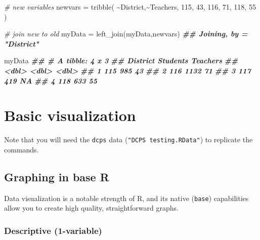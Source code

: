 \documentclass[
  12pt,
]{krantz}
\newenvironment{Shaded}{\begin{snugshade}}{\end{snugshade}}
\newcommand{\CommentTok}[1]{\textcolor[rgb]{0.56,0.35,0.01}{\textit{#1}}}
\newcommand{\DecValTok}[1]{\textcolor[rgb]{0.00,0.00,0.81}{#1}}
\newcommand{\DocumentationTok}[1]{\textcolor[rgb]{0.56,0.35,0.01}{\textbf{\textit{#1}}}}
\newcommand{\FunctionTok}[1]{\textcolor[rgb]{0.00,0.00,0.00}{#1}}
\newcommand{\NormalTok}[1]{#1}
\newcommand{\OtherTok}[1]{\textcolor[rgb]{0.56,0.35,0.01}{#1}}
\newcommand{\SpecialCharTok}[1]{\textcolor[rgb]{0.00,0.00,0.00}{#1}}
\begin{document}
\begin{Shaded}
\begin{Highlighting}[]
  \CommentTok{\# new variables}
\NormalTok{    newvars }\OtherTok{=} \FunctionTok{tribble}\NormalTok{(}
      \SpecialCharTok{\textasciitilde{}}\NormalTok{District,}\SpecialCharTok{\textasciitilde{}}\NormalTok{Teachers,}
      \DecValTok{115}\NormalTok{, }\DecValTok{43}\NormalTok{,}
      \DecValTok{116}\NormalTok{, }\DecValTok{71}\NormalTok{,}
      \DecValTok{118}\NormalTok{, }\DecValTok{55}
\NormalTok{    )}

  \CommentTok{\# join new to old}
\NormalTok{    myData }\OtherTok{=} \FunctionTok{left\_join}\NormalTok{(myData,newvars)}
\DocumentationTok{\#\# Joining, by = "District"}
    
\NormalTok{    myData}
\DocumentationTok{\#\# \# A tibble: 4 x 3}
\DocumentationTok{\#\#   District Students Teachers}
\DocumentationTok{\#\#      \textless{}dbl\textgreater{}    \textless{}dbl\textgreater{}    \textless{}dbl\textgreater{}}
\DocumentationTok{\#\# 1      115      985       43}
\DocumentationTok{\#\# 2      116     1132       71}
\DocumentationTok{\#\# 3      117      419       NA}
\DocumentationTok{\#\# 4      118      633       55}
\end{Highlighting}
\end{Shaded}

\hypertarget{basic-visualization}{%
\chapter{Basic visualization}\label{basic-visualization}}

Note that you will need the \texttt{dcps} data (\texttt{"DCPS\ testing.RData"}) to replicate the commands.

\hypertarget{graphing-in-base-r}{%
\section{Graphing in base R}\label{graphing-in-base-r}}

Data visualization is a notable strength of R, and its native (\texttt{base}) capabilities allow you to create high quality, straightforward graphs.

\hypertarget{descriptive-1-variable}{%
\subsection{Descriptive (1-variable)}\label{descriptive-1-variable}}
\end{document}
